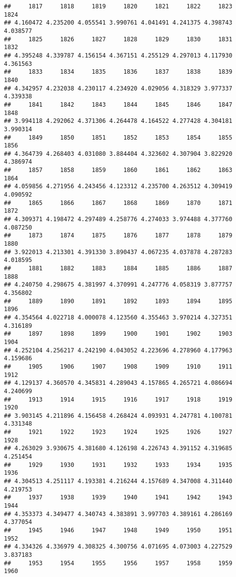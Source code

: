 \documentclass[
]{article}
\begin{document}
\begin{verbatim}
##     1817     1818     1819     1820     1821     1822     1823     1824 
## 4.160472 4.235200 4.055541 3.990761 4.041491 4.241375 4.398743 4.038577 
##     1825     1826     1827     1828     1829     1830     1831     1832 
## 4.395248 4.339787 4.156154 4.367151 4.255129 4.297013 4.117930 4.361563 
##     1833     1834     1835     1836     1837     1838     1839     1840 
## 4.342957 4.232038 4.230117 4.234920 4.029056 4.318329 3.977337 4.339338 
##     1841     1842     1843     1844     1845     1846     1847     1848 
## 3.994118 4.292062 4.371306 4.264478 4.164522 4.277428 4.304181 3.990314 
##     1849     1850     1851     1852     1853     1854     1855     1856 
## 4.364739 4.268403 4.031080 3.884404 4.323602 4.307904 3.822920 4.386974 
##     1857     1858     1859     1860     1861     1862     1863     1864 
## 4.059856 4.271956 4.243456 4.123312 4.235700 4.263512 4.309419 4.090592 
##     1865     1866     1867     1868     1869     1870     1871     1872 
## 4.309371 4.198472 4.297489 4.258776 4.274033 3.974488 4.377760 4.087250 
##     1873     1874     1875     1876     1877     1878     1879     1880 
## 3.922013 4.213301 4.391330 3.890437 4.067235 4.037878 4.287283 4.018595 
##     1881     1882     1883     1884     1885     1886     1887     1888 
## 4.240750 4.298675 4.381997 4.370991 4.247776 4.058319 3.877757 4.356802 
##     1889     1890     1891     1892     1893     1894     1895     1896 
## 4.354564 4.022718 4.000078 4.123560 4.355463 3.970214 4.327351 4.316189 
##     1897     1898     1899     1900     1901     1902     1903     1904 
## 4.252104 4.256217 4.242190 4.043052 4.223696 4.278960 4.177963 4.159686 
##     1905     1906     1907     1908     1909     1910     1911     1912 
## 4.129137 4.360570 4.345831 4.289043 4.157865 4.265721 4.086694 4.240699 
##     1913     1914     1915     1916     1917     1918     1919     1920 
## 3.903145 4.211896 4.156458 4.268424 4.093931 4.247781 4.100781 4.331348 
##     1921     1922     1923     1924     1925     1926     1927     1928 
## 4.263029 3.930675 4.381680 4.126198 4.226743 4.391152 4.319685 4.251454 
##     1929     1930     1931     1932     1933     1934     1935     1936 
## 4.304513 4.251117 4.193381 4.216244 4.157689 4.347008 4.311440 4.219753 
##     1937     1938     1939     1940     1941     1942     1943     1944 
## 4.353373 4.349477 4.340743 4.383891 3.997703 4.389161 4.286169 4.377054 
##     1945     1946     1947     1948     1949     1950     1951     1952 
## 4.334326 4.336979 4.308325 4.300756 4.071695 4.073003 4.227529 3.837183 
##     1953     1954     1955     1956     1957     1958     1959     1960 

\end{verbatim}
\end{document}
